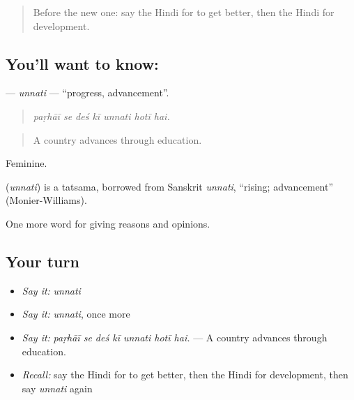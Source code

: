 \label{lesson:HI-C368-unnati}



\begin{quote}
Before the new one: say the Hindi for to get better, then the Hindi for development.
\end{quote}

\subsection*{You'll want to know: }
\textbf{} — \emph{unnati} — \textquotedblleft{}progress, advancement\textquotedblright{}.

\begin{quote}
      
\end{quote}

\begin{quote}
\emph{paṛhāī se deś kī unnati hotī hai.}
\end{quote}

\begin{quote}
A country advances through education.
\end{quote}

Feminine.

\begin{cousinweb}
\textbf{} (\emph{unnati}) is a tatsama, borrowed from Sanskrit \emph{unnati}, \textquotedblleft{}rising; advancement\textquotedblright{} (Monier-Williams).
\end{cousinweb}

\begin{grammarlens}[title={What you've built}]
One more word for giving reasons and opinions.
\end{grammarlens}

\subsection*{Your turn}
\begin{itemize}
\raggedright
  \item \emph{Say it:} \emph{unnati}
  \item \emph{Say it:} \emph{unnati}, once more
  \item \emph{Say it:} \emph{paṛhāī se deś kī unnati hotī hai.} — A country advances through education.
  \item \emph{Recall:} say the Hindi for to get better, then the Hindi for development, then say \emph{unnati} again
\end{itemize}

